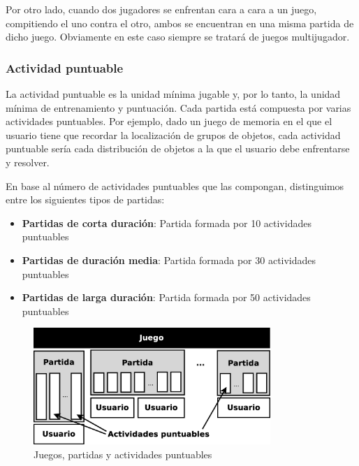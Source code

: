 Por otro lado, cuando dos jugadores se enfrentan cara a cara a un juego, compitiendo el uno contra el otro, ambos se encuentran en una misma partida de dicho juego. Obviamente en este caso siempre se tratará de juegos multijugador.

\subsubsection{Actividad puntuable}

La actividad puntuable es la unidad mínima jugable y, por lo tanto, la unidad mínima de entrenamiento y puntuación. Cada partida está compuesta por varias actividades puntuables. Por ejemplo, dado un juego de memoria en el que el usuario tiene que recordar la localización de grupos de objetos, cada actividad puntuable sería cada distribución de objetos a la que el usuario debe enfrentarse y resolver.

En base al número de actividades puntuables que las compongan, distinguimos entre los siguientes tipos de partidas:

\begin{itemize}
\item {\bf Partidas de corta duración}: Partida formada por 10 actividades puntuables
\item {\bf Partidas de duración media}: Partida formada por 30 actividades puntuables
\item {\bf Partidas de larga duración}: Partida formada por 50 actividades puntuables
\end{itemize}

\begin{figure}[H]
  \begin{center}
    \includegraphics[width=0.8\textwidth]{images/juegos-partidas-actividades.eps}
    \caption{Juegos, partidas y actividades puntuables}
    \label{fig::juegos-partidas-actividades}
  \end{center}
\end{figure}

